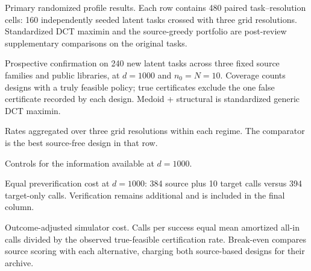 \begin{table}[p]
\centering
\small
\caption{Primary randomized profile results.  Each row contains 480 paired
task--resolution cells: 160 independently seeded latent tasks crossed with
three grid resolutions.  Standardized DCT maximin and the source-greedy
portfolio are post-review supplementary comparisons on the original tasks.}
\label{tab:primary-results}
\resizebox{\textwidth}{!}{}
\end{table}

\begin{table}[p]
\centering
\small
\caption{Prospective confirmation on 240 new latent tasks across three fixed
source families and public libraries, at $d=1000$ and $n_0=N=10$.  Coverage
counts designs with a truly feasible policy; true certificates exclude the
one false certificate recorded by each design.  Medoid + structural is
standardized generic DCT maximin.}
\label{tab:confirmation}
\resizebox{\textwidth}{!}{}
\end{table}

\begin{table}[p]
\centering
\small
\caption{Rates aggregated over three grid resolutions within each regime.
The comparator is the best source-free design in that row.}
\label{tab:regime-results}
\resizebox{\textwidth}{!}{}
\end{table}

\begin{table}[p]
\centering
\small
\caption{Controls for the information available at $d=1000$.}
\label{tab:schema-results}
\resizebox{0.88\textwidth}{!}{}
\end{table}

\begin{table}[p]
\centering
\scriptsize
\caption{Equal preverification cost at $d=1000$: 384 source plus 10 target
calls versus 394 target-only calls.  Verification remains additional and is
included in the final column.}
\label{tab:equal-cost}
\resizebox{\textwidth}{!}{}
\end{table}

\begin{table}[p]
\centering
\scriptsize
\caption{Outcome-adjusted simulator cost.  Calls per success equal mean
amortized all-in calls divided by the observed true-feasible certification
rate.  Break-even compares source scoring with each alternative, charging
both source-based designs for their archive.}
\label{tab:outcome-adjusted-cost}
\resizebox{\textwidth}{!}{}
\end{table}

